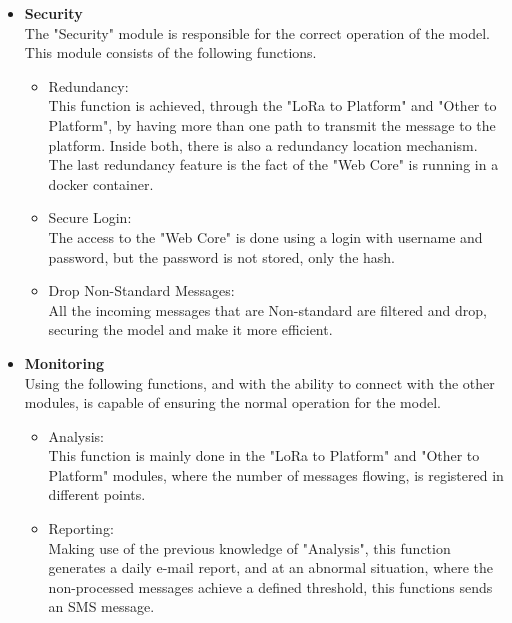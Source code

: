\begin{itemize}
   \item \textbf{Security} \\
The "Security"  module is responsible for the correct operation of the model. This module consists of the following functions.
   \begin{itemize}
     \item Redundancy: \\
      This function is achieved, through the "LoRa to Platform" and "Other to Platform", by having more than one path to transmit the message to the platform.
      Inside both, there is also a redundancy location mechanism.
      The last redundancy feature is the fact of the "Web Core" is running in a docker container. 
   \end{itemize}
   \begin{itemize}
     \item Secure Login:  \\
      The access to the "Web Core" is done using a login with username and password, but the password is not stored, only the hash.
   \end{itemize}
   \begin{itemize}
     \item Drop Non-Standard Messages: \\
      All the incoming messages that are Non-standard are filtered and drop, securing the model and make it more efficient.
   \end{itemize}
\end{itemize}

\begin{itemize}
   \item \textbf{Monitoring} \\
   Using the following functions, and with the ability to connect with the other modules, is capable of ensuring the normal operation for the model.
   \begin{itemize}
     \item Analysis:\\
     This function is mainly done in the "LoRa to Platform" and "Other to Platform" modules, where the number of messages flowing, is registered in different points.
   \end{itemize}
   \begin{itemize}
     \item Reporting: \\
     Making use of the previous knowledge of "Analysis", this function generates a daily e-mail report, and at an abnormal situation, where the non-processed messages achieve a defined threshold, this functions sends an SMS message.
   \end{itemize}
\end{itemize}

